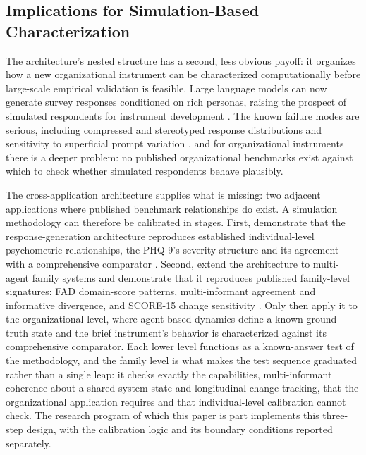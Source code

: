 \documentclass[12pt, letterpaper]{article}
\begin{document}
\subsection{Implications for Simulation-Based Characterization}
\label{sec:simulation-implications}

The architecture's nested structure has a second, less obvious payoff: it organizes how a new organizational instrument can be characterized computationally before large-scale empirical validation is feasible. Large language models can now generate survey responses conditioned on rich personas, raising the prospect of simulated respondents for instrument development \parencite{argyle2023,park2023}. The known failure modes are serious, including compressed and stereotyped response distributions and sensitivity to superficial prompt variation \parencite{bisbee2024,tjuatja2024}, and for organizational instruments there is a deeper problem: no published organizational benchmarks exist against which to check whether simulated respondents behave plausibly.

The cross-application architecture supplies what is missing: two adjacent applications where published benchmark relationships do exist. A simulation methodology can therefore be calibrated in stages. First, demonstrate that the response-generation architecture reproduces established individual-level psychometric relationships, the PHQ-9's severity structure and its agreement with a comprehensive comparator \parencite{kroenke2001}. Second, extend the architecture to multi-agent family systems and demonstrate that it reproduces published family-level signatures: FAD domain-score patterns, multi-informant agreement and informative divergence, and SCORE-15 change sensitivity \parencite{epstein1983,stratton2014}. Only then apply it to the organizational level, where agent-based dynamics define a known ground-truth state \parencite{bonabeau2002} and the brief instrument's behavior is characterized against its comprehensive comparator. Each lower level functions as a known-answer test of the methodology, and the family level is what makes the test sequence graduated rather than a single leap: it checks exactly the capabilities, multi-informant coherence about a shared system state and longitudinal change tracking, that the organizational application requires and that individual-level calibration cannot check. The research program of which this paper is part implements this three-step design, with the calibration logic and its boundary conditions reported separately.
\end{document}
